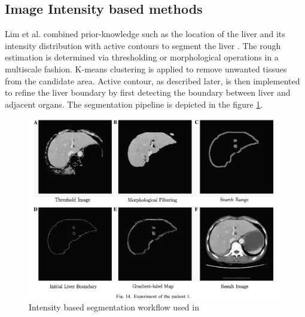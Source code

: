 \documentclass[]{article}
\begin{document}
\subsection*{Image Intensity based methods}

Lim et al. combined prior-knowledge such as the location of the liver
and its intensity distribution with active contours to segment the
liver \cite{Lim2004, Lim2005, Lim2006}. The rough estimation is determined via thresholding or
morphological operations in a multiscale fashion. K-means clustering is
applied to remove unwanted tissues from the candidate area. Active
contour, as described later, is then implemented to refine the liver boundary by first
detecting the boundary between liver and adjacent organs.
The segmentation pipeline is depicted in the figure \ref{IntensityBasedLim}.

\begin{figure}[ht!]
	\centering
	\includegraphics[width=\linewidth]{images/image10}
	\caption{Intensity based segmentation workflow used in \cite{Lim2006}}
	\label{IntensityBasedLim}
\end{figure}
\end{document}
